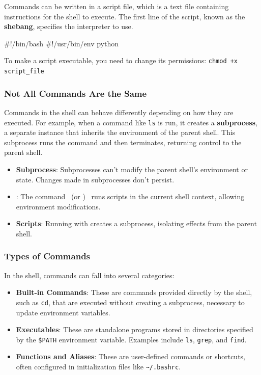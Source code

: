 Commands can be written in a script file, which is a text file containing instructions for the shell to execute. 
The first line of the script, known as the \textbf{shebang}, specifies the interpreter to use.

\begin{codeblock}[language=bash, numbers=none]
#!/bin/bash
#!/usr/bin/env python
\end{codeblock}

To make a script executable, you need to change its permissions:
\texttt{chmod +x script\_file}

\subsubsection{Not All Commands Are the Same}

Commands in the shell can behave differently depending on how they are executed. For example, when a command like \texttt{ls} is run, it creates a \textbf{subprocess}, a separate instance that inherits the environment of the parent shell. This subprocess runs the command and then terminates, returning control to the parent shell.

\begin{tipsblock}
    \begin{itemize}
        \item \textbf{Subprocess}: Subprocesses can't modify the parent shell's environment or state. Changes made in subprocesses don't persist.
        \item \textbf{}: The  command \ (or ) \ runs scripts in the current shell context, allowing environment modifications.
        \item \textbf{Scripts}: Running with  creates a subprocess, isolating effects from the parent shell.
    \end{itemize}
\end{tipsblock}

\subsubsection{Types of Commands}

In the shell, commands can fall into several categories:

\begin{itemize}
    \item \textbf{Built-in Commands}: These are commands provided directly by the shell, such as \texttt{cd}, that are executed without creating a subprocess, necessary to update environment variables.
    \item \textbf{Executables}: These are standalone programs stored in directories specified by the \texttt{\$PATH} environment variable. Examples include \texttt{ls}, \texttt{grep}, and \texttt{find}.
    \item \textbf{Functions and Aliases}: These are user-defined commands or shortcuts, often configured in initialization files like \texttt{\textasciitilde/.bashrc}.
\end{itemize}

